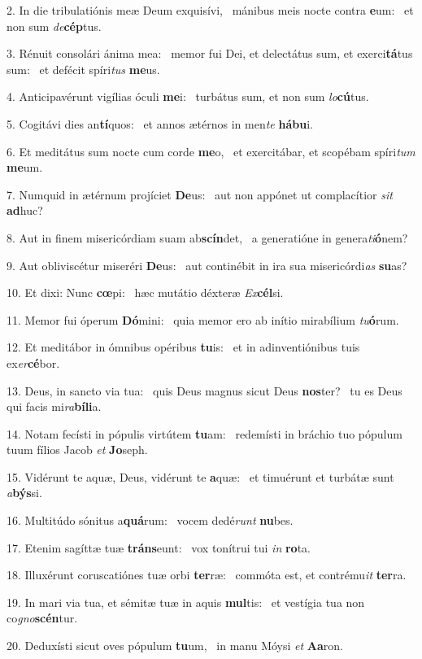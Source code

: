 2. In die tribulatiónis meæ Deum exquisívi, \dag\  mánibus meis nocte contra \textbf{e}um: \ast\  et non sum \textit{de}\textbf{cép}tus.\

3. Rénuit consolári ánima mea: \dag\  memor fui Dei, et delectátus sum, et exerci\textbf{tá}tus sum: \ast\  et defécit spíri\textit{tus} \textbf{me}us.\

4. Anticipavérunt vigílias óculi \textbf{me}i: \ast\  turbátus sum, et non sum \textit{lo}\textbf{cú}tus.\

5. Cogitávi dies an\textbf{tí}quos: \ast\  et annos ætérnos in men\textit{te} \textbf{há}\textbf{bu}i.\

6. Et meditátus sum nocte cum corde \textbf{me}o, \ast\  et exercitábar, et scopébam spíri\textit{tum} \textbf{me}um.\

7. Numquid in ætérnum projíciet \textbf{De}us: \ast\  aut non appónet ut complacítior \textit{sit} \textbf{ad}huc?\

8. Aut in finem misericórdiam suam ab\textbf{scín}det, \ast\  a generatióne in genera\textit{ti}\textbf{ó}nem?\

9. Aut obliviscétur miseréri \textbf{De}us: \ast\  aut continébit in ira sua misericórdi\textit{as} \textbf{su}as?\

10. Et dixi: Nunc \textbf{cœ}pi: \ast\  hæc mutátio déxteræ \textit{Ex}\textbf{cél}si.\

11. Memor fui óperum \textbf{Dó}mini: \ast\  quia memor ero ab inítio mirabílium \textit{tu}\textbf{ó}rum.\

12. Et meditábor in ómnibus opéribus \textbf{tu}is: \ast\  et in adinventiónibus tuis ex\textit{er}\textbf{cé}bor.\

13. Deus, in sancto via tua: \dag\  quis Deus magnus sicut Deus \textbf{nos}ter? \ast\  tu es Deus qui facis mi\textit{ra}\textbf{bí}\textbf{li}a.\

14. Notam fecísti in pópulis virtútem \textbf{tu}am: \ast\  redemísti in bráchio tuo pópulum tuum fílios Jacob \textit{et} \textbf{Jo}seph.\

15. Vidérunt te aquæ, Deus, vidérunt te \textbf{a}quæ: \ast\  et timuérunt et turbátæ sunt \textit{a}\textbf{býs}si.\

16. Multitúdo sónitus a\textbf{quá}rum: \ast\  vocem dedé\textit{runt} \textbf{nu}bes.\

17. Etenim sagíttæ tuæ \textbf{tráns}eunt: \ast\  vox tonítrui tui \textit{in} \textbf{ro}ta.\

18. Illuxérunt coruscatiónes tuæ orbi \textbf{ter}ræ: \ast\  commóta est, et contrému\textit{it} \textbf{ter}ra.\

19. In mari via tua, et sémitæ tuæ in aquis \textbf{mul}tis: \ast\  et vestígia tua non co\textit{gno}\textbf{scén}tur.\

20. Deduxísti sicut oves pópulum \textbf{tu}um, \ast\  in manu Móysi \textit{et} \textbf{A}\textbf{a}ron.\

